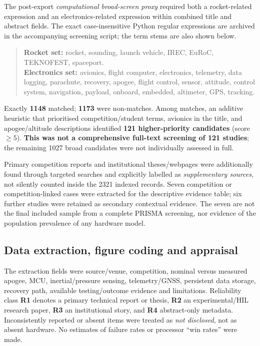 \documentclass[10pt,a4paper]{article}
\begin{document}
The post-export \emph{computational broad-screen proxy} required both a rocket-related expression and an electronics-related expression within combined title and abstract fields. The exact case-insensitive Python regular expressions are archived in the accompanying screening script; the term stems are also shown below.
\begin{quote}\footnotesize
\textbf{Rocket set:} rocket, sounding, launch vehicle, IREC, EuRoC, TEKNOFEST, spaceport.\\
\textbf{Electronics set:} avionics, flight computer, electronics, telemetry, data logging, parachute, recovery, apogee, flight control, sensor, attitude, control system, navigation, payload, onboard, embedded, altimeter, GPS, tracking.
\end{quote} Exactly \textbf{1148} matched; \textbf{1173} were non-matches. Among matches, an additive heuristic that prioritised competition/student terms, avionics in the title, and apogee/altitude descriptions identified \textbf{121 higher-priority candidates} (score $\geq5$). \textbf{This was not a comprehensive full-text screening of 121 studies}; the remaining 1027 broad candidates were not individually assessed in full.

Primary competition reports and institutional theses/webpages were additionally found through targeted searches and explicitly labelled as \emph{supplementary sources}, not silently counted inside the 2321 indexed records. Seven competition or competition-linked cases were extracted for the descriptive evidence table; six further studies were retained as secondary contextual evidence. The seven are not the final included sample from a complete PRISMA screening, nor evidence of the population prevalence of any hardware model.

\subsection{Data extraction, figure coding and appraisal}
The extraction fields were source/venue, competition, nominal versus measured apogee, MCU, inertial/pressure sensing, telemetry/GNSS, persistent data storage, recovery path, available testing/outcome evidence and limitations. Reliability class \textbf{R1} denotes a primary technical report or thesis, \textbf{R2} an experimental/HIL research paper, \textbf{R3} an institutional story, and \textbf{R4} abstract-only metadata. Inconsistently reported or absent items were treated as \emph{not disclosed}, not as absent hardware. No estimates of failure rates or processor ``win rates'' were made.
\end{document}
